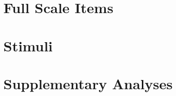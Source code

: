 \documentclass[11pt,a4paper]{article}
\begin{document}


\appendix

\section{Full Scale Items}
\label{app:scales}

\section{Stimuli}
\label{app:stimuli}

\section{Supplementary Analyses}
\label{app:supp}
\end{document}
